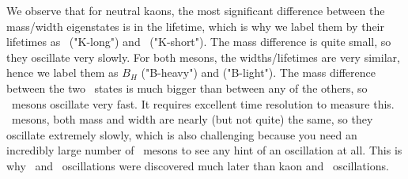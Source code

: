 We observe that for neutral kaons, the most significant difference between the mass/width eigenstates is in the lifetime, which is why we label them by their lifetimes as \Kl\ ("K-long") and \Ks\ ("K-short"). The mass difference is quite small, so they oscillate very slowly. For both  mesons, the widths/lifetimes are very similar, hence we label them as $B_H$ ("B-heavy") and  ("B-light"). The mass difference between the two \Bso\ states is much bigger than between any of the others, so \Bso\ mesons oscillate very fast. It requires excellent time resolution to measure this. \Do\ mesons, both mass and width are nearly (but not quite) the same, so they oscillate extremely slowly, which is also challenging because you need an incredibly large number of \Do\ mesons to see any hint of an oscillation at all. This is why \Bso\ and \Do\ oscillations were discovered much later than kaon and \Bdo\ oscillations.

